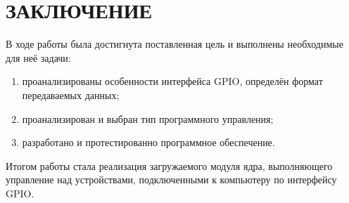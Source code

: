 \section*{ЗАКЛЮЧЕНИЕ}

В ходе работы была достигнута поставленная цель и выполнены необходимые для неё задачи:
\begin{enumerate}
	\item проанализированы особенности интерфейса GPIO, определён формат передаваемых данных;
	\item проанализирован и выбран тип программного управления;
	\item разработано и протестированно программное обеспечение.
\end{enumerate}

Итогом работы стала реализация загружаемого модуля ядра, выполняющего управление над устройствами, подключенными к компьютеру по интерфейсу GPIO.

\pagebreak
